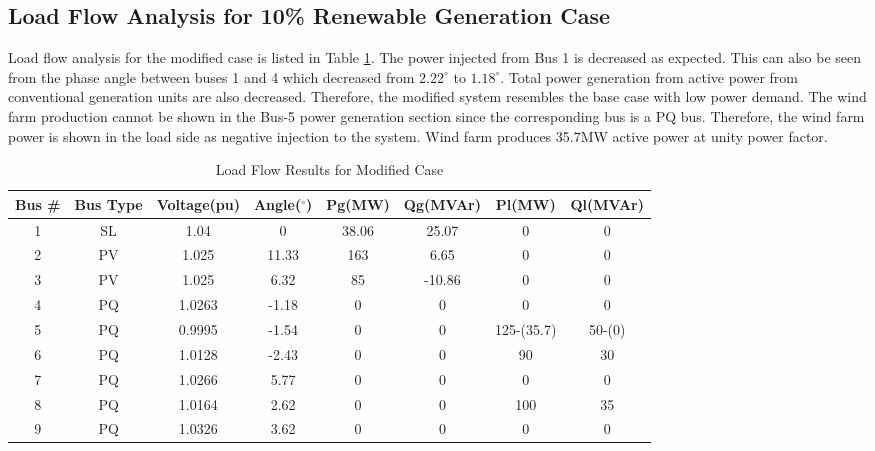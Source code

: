 \subsection{Load Flow Analysis for 10\% Renewable Generation Case}
Load flow analysis for the modified case is listed in Table \ref{loadflow_case2}. The power injected from Bus 1 is decreased as expected. This can also be seen from the phase angle between buses 1 and 4 which decreased from $2.22^{\circ}$ to $1.18^{\circ}$. Total power generation from active power from conventional generation units are also decreased. Therefore, the modified system resembles the base case with low power demand. The wind farm production cannot be shown in the Bus-5 power generation section since the corresponding bus is a PQ bus. Therefore, the wind farm power is shown in the load side as negative injection to the system. Wind farm produces 35.7MW active power at unity power factor. 
\begin{table}[h!]
	\centering
	\resizebox{\textwidth}{!}
	{
	\begin{tabular}{cclccccc}
		\hline
		Bus \# & Bus Type & \multicolumn{1}{c}{Voltage(pu)} & Angle($^{\circ}$)& Pg(MW)    & Qg(MVAr)     & Pl(MW)  & Ql(MVAr)   \\ \hline
		1      & SL       & \multicolumn{1}{c}{1.04}    & 0     & 38.06 & 25.07  & 0   & 0  \\
		2      & PV       & \multicolumn{1}{c}{1.025}   & 11.33 & 163   & 6.65   & 0   & 0  \\
		3      & PV       & \multicolumn{1}{c}{1.025}   & 6.32  & 85    & -10.86 & 0   & 0  \\
		4      & PQ       & \multicolumn{1}{c}{1.0263}  & -1.18 & 0     & 0      & 0   & 0  \\
		5      & PQ       & \multicolumn{1}{c}{0.9995}  & -1.54 & 0     & 0      & 125-(35.7) & 50-(0) \\
		6      & PQ       & \multicolumn{1}{c}{1.0128}  & -2.43 & 0     & 0      & 90  & 30 \\
		7      & PQ       & \multicolumn{1}{c}{1.0266}  & 5.77  & 0     & 0      & 0   & 0  \\
		8      & PQ       & \multicolumn{1}{c}{1.0164}  & 2.62  & 0     & 0      & 100 & 35 \\
		9      & PQ       & \multicolumn{1}{c}{1.0326}  & 3.62  & 0     & 0      & 0   & 0  \\ \hline
	\end{tabular}
	}
	\caption{Load Flow Results for Modified Case}
	\label{loadflow_case2}
\end{table}
